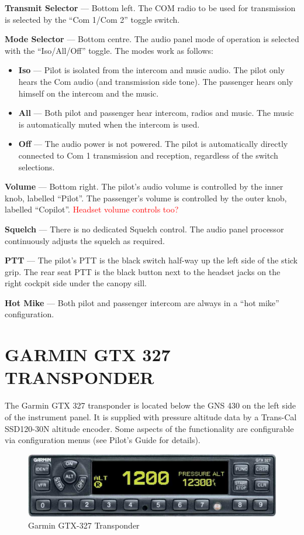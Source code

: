 \textbf{Transmit Selector} --- Bottom left. The COM radio to be used for transmission is selected by the ``Com 1/Com 2'' toggle switch.

\textbf{Mode Selector} --- Bottom centre. The audio panel mode of operation is selected with the ``Iso/All/Off'' toggle. The modes work as follows:
\begin{itemize}
\item \textbf{Iso} --- Pilot is isolated from the intercom and music audio. The pilot only hears the Com audio (and transmission side tone). The passenger hears only himself on the intercom and the music.
\item \textbf{All} --- Both pilot and passenger hear intercom, radios and music. The music is automatically muted when the intercom is used.
\item \textbf{Off} --- The audio power is not powered. The pilot is automatically directly connected to Com 1 transmission and reception, regardless of the switch selections.
\end{itemize}

\textbf{Volume} --- Bottom right. The pilot's audio volume is controlled by the inner knob, labelled ``Pilot''. The passenger's volume is controlled by the outer knob, labelled ``Copilot''. \textcolor{red}{Headset volume controls too?}

\textbf{Squelch} --- There is no dedicated Squelch control. The audio panel processor continuously adjusts the squelch as required.

\textbf{PTT} --- The pilot's PTT is the black switch half-way up the left side of the stick grip. The rear seat PTT is the black button next to the headset jacks on the right cockpit side under the canopy sill.

\textbf{Hot Mike} --- Both pilot and passenger intercom are always in a ``hot mike'' configuration.

\section{GARMIN GTX 327 TRANSPONDER}

The Garmin GTX 327 transponder is located below the GNS 430 on the left side of the instrument panel. It is supplied with pressure altitude data by a Trans-Cal SSD120-30N altitude encoder. Some aspects of the functionality are configurable via configuration menus (see Pilot's Guide for details).
\begin{figure}
[htb]
\begin{center}
\includegraphics[scale=0.8]{../Diagrams/GTX327}
\end{center}
\caption{Garmin GTX-327 Transponder}
\end{figure}

